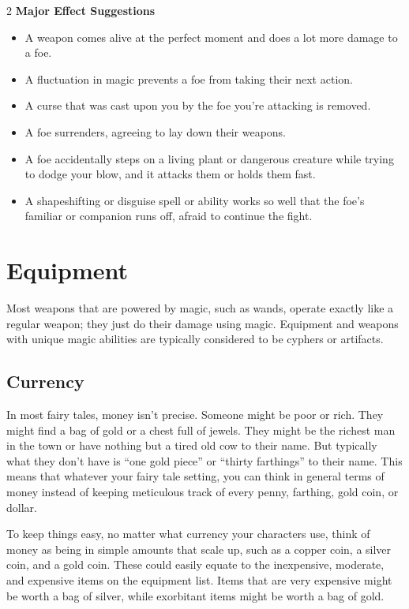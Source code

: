 \begin{multicols}{2}
\textbf{Major Effect Suggestions}
\begin{itemize}
\item A weapon comes alive at the perfect moment and does a lot more damage to a foe.
\item A fluctuation in magic prevents a foe from taking their next action.
\item A curse that was cast upon you by the foe you’re attacking is removed.
\item A foe surrenders, agreeing to lay down their weapons.
\item A foe accidentally steps on a living plant or dangerous creature while trying to dodge your blow, and it attacks them or holds them fast.
\item A shapeshifting or disguise spell or ability works so well that the foe’s familiar or companion runs off, afraid to continue the fight.
\end{itemize}

\section{Equipment}

Most weapons that are powered by magic, such as wands, operate exactly like a regular weapon; they just do their damage using magic.
Equipment and weapons with unique magic abilities are typically considered to be cyphers or artifacts.

\subsection{Currency}

In most fairy tales, money isn’t precise. Someone might be poor or rich. They might find a bag of gold or a chest full of jewels. They might be the richest man in the town or have nothing but a tired old cow to their name. But typically what they don’t have is “one gold piece” or “thirty farthings” to their name. This means that whatever your fairy tale setting, you can think in general terms of money instead of keeping meticulous track of every penny, farthing, gold coin, or dollar.

To keep things easy, no matter what currency your characters use, think of money as being in simple amounts that scale up, such as a copper coin, a silver coin, and a gold coin. These could easily equate to the inexpensive, moderate, and expensive items on the equipment list. Items that are very expensive might be worth a bag of silver, while exorbitant items might be worth a bag of gold.


\end{multicols}
